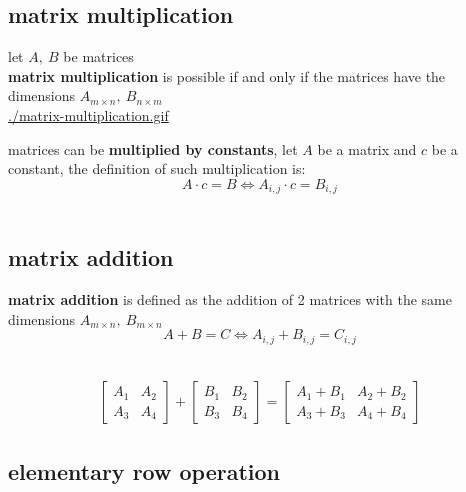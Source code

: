 \documentclass[a4paper,12pt]{article}
\begin{document}
\subsection{matrix multiplication}
\label{sec:org599cf8b}
\begin{definition}
let \(A,\ B\) be matrices\\
\textbf{matrix multiplication} is possible if and only if the matrices have the dimensions \(A_{m \times n},\ B_{n \times m}\)\\
\url{./matrix-multiplication.gif}\\
\end{definition}
\begin{definition}
matrices can be \textbf{multiplied by constants}, let \(A\) be a matrix and \(c\) be a constant, the definition of such multiplication is:\\
\[
  A \cdot c = B \iff A_{i,j} \cdot c = B_{i,j}
\]\\
\end{definition}
\subsection{matrix addition}
\label{sec:org4162d81}
\begin{definition}
\textbf{matrix addition} is defined as the addition of 2 matrices with the same dimensions \(A_{m \times n},\ B_{m \times n}\)\\
\[
  A + B = C \iff A_{i,j} + B_{i,j} = C_{i,j}
\]\\
\begin{my_example}
\begin{gather*}
  \begin{bmatrix} A_1 & A_2\\ A_3 & A_4 \end{bmatrix} + \begin{bmatrix} B_1 & B_2\\ B_3 & B_4 \end{bmatrix} = \begin{bmatrix} A_1+B_1 & A_2+B_2\\ A_3+B_3 & A_4+B_4 \end{bmatrix}
\end{gather*}
\end{my_example}
\end{definition}
\subsection{elementary row operation}
\label{sec:orgdd80885}
\end{document}
